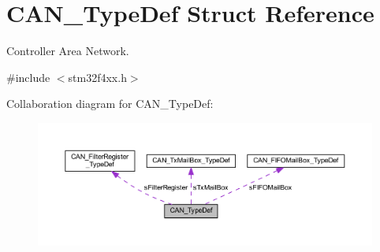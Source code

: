 \hypertarget{struct_c_a_n___type_def}{}\section{C\+A\+N\+\_\+\+Type\+Def Struct Reference}
\label{struct_c_a_n___type_def}


Controller Area Network.  




{\ttfamily \#include $<$stm32f4xx.\+h$>$}



Collaboration diagram for C\+A\+N\+\_\+\+Type\+Def\+:\nopagebreak
\begin{figure}[H]
\begin{center}
\leavevmode
\includegraphics[width=350pt]{struct_c_a_n___type_def__coll__graph}
\end{center}
\end{figure}

